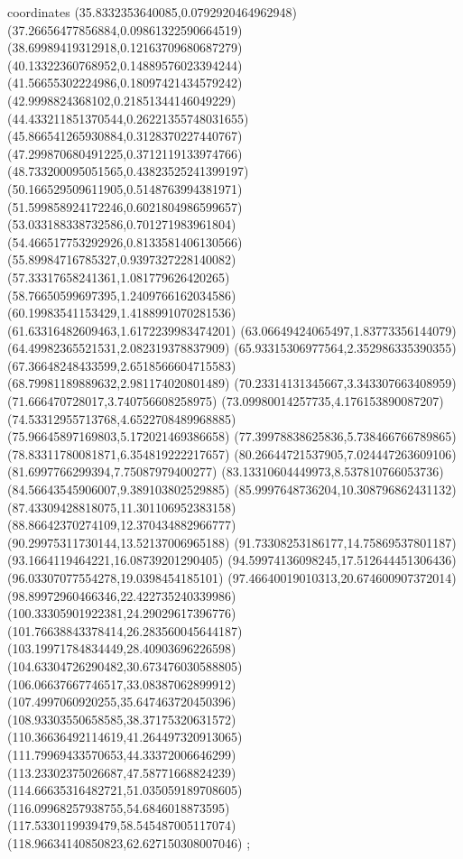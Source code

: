 coordinates {%
(35.8332353640085,0.0792920464962948)
(37.26656477856884,0.09861322590664519)
(38.69989419312918,0.12163709680687279)
(40.13322360768952,0.14889576023394244)
(41.56655302224986,0.18097421434579242)
(42.9998824368102,0.21851344146049229)
(44.433211851370544,0.26221355748031655)
(45.866541265930884,0.3128370227440767)
(47.299870680491225,0.3712119133974766)
(48.733200095051565,0.43823525241399197)
(50.166529509611905,0.5148763994381971)
(51.599858924172246,0.6021804986599657)
(53.033188338732586,0.701271983961804)
(54.466517753292926,0.8133581406130566)
(55.89984716785327,0.9397327228140082)
(57.33317658241361,1.081779626420265)
(58.76650599697395,1.2409766162034586)
(60.19983541153429,1.4188991070281536)
(61.63316482609463,1.6172239983474201)
(63.06649424065497,1.83773356144079)
(64.49982365521531,2.082319378837909)
(65.93315306977564,2.352986335390355)
(67.36648248433599,2.6518566604715583)
(68.79981189889632,2.981174020801489)
(70.23314131345667,3.343307663408959)
(71.666470728017,3.740756608258975)
(73.09980014257735,4.176153890087207)
(74.53312955713768,4.6522708489968885)
(75.96645897169803,5.172021469386658)
(77.39978838625836,5.738466766789865)
(78.83311780081871,6.354819222217657)
(80.26644721537905,7.024447263609106)
(81.6997766299394,7.75087979400277)
(83.13310604449973,8.537810766053736)
(84.56643545906007,9.389103802529885)
(85.9997648736204,10.308796862431132)
(87.43309428818075,11.301106952383158)
(88.86642370274109,12.370434882966777)
(90.29975311730144,13.52137006965188)
(91.73308253186177,14.75869537801187)
(93.1664119464221,16.08739201290405)
(94.59974136098245,17.512644451306436)
(96.03307077554278,19.0398454185101)
(97.46640019010313,20.674600907372014)
(98.89972960466346,22.422735240339986)
(100.33305901922381,24.29029617396776)
(101.76638843378414,26.283560045644187)
(103.19971784834449,28.40903696226598)
(104.63304726290482,30.673476030588805)
(106.06637667746517,33.08387062899912)
(107.4997060920255,35.647463720450396)
(108.93303550658585,38.37175320631572)
(110.36636492114619,41.264497320913065)
(111.79969433570653,44.33372006646299)
(113.23302375026687,47.58771668824239)
(114.66635316482721,51.035059189708605)
(116.09968257938755,54.6846018873595)
(117.5330119939479,58.545487005117074)
(118.96634140850823,62.627150308007046)
};
